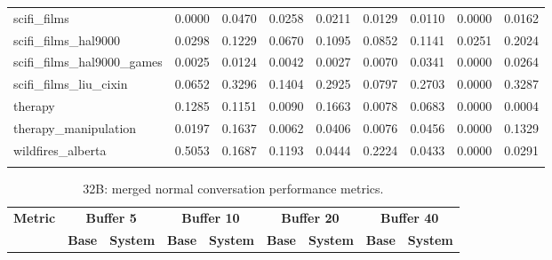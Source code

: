 \begin{landscape}
\begin{longtable}{@{}p{3.8cm}cccccccc@{}}
scifi\_films & 0.0000 & 0.0470 & 0.0258 & 0.0211 & 0.0129 & 0.0110 & 0.0000 & 0.0162 \\
scifi\_films\_hal9000 & 0.0298 & 0.1229 & 0.0670 & 0.1095 & 0.0852 & 0.1141 & 0.0251 & 0.2024 \\
scifi\_films\_hal9000\_games & 0.0025 & 0.0124 & 0.0042 & 0.0027 & 0.0070 & 0.0341 & 0.0000 & 0.0264 \\
scifi\_films\_liu\_cixin & 0.0652 & 0.3296 & 0.1404 & 0.2925 & 0.0797 & 0.2703 & 0.0000 & 0.3287 \\
therapy & 0.1285 & 0.1151 & 0.0090 & 0.1663 & 0.0078 & 0.0683 & 0.0000 & 0.0004 \\
therapy\_manipulation & 0.0197 & 0.1637 & 0.0062 & 0.0406 & 0.0076 & 0.0456 & 0.0000 & 0.1329 \\
wildfires\_alberta & 0.5053 & 0.1687 & 0.1193 & 0.0444 & 0.2224 & 0.0433 & 0.0000 & 0.0291 \\
\botrule
\end{longtable}
\begin{longtable}{@{}p{3.8cm}cccccccc@{}}
\caption{32B: merged normal conversation performance metrics.}\label{tab:app_32b_perf_normal}\\

\toprule
\textbf{Metric} & \multicolumn{2}{c}{\textbf{Buffer 5}} & \multicolumn{2}{c}{\textbf{Buffer 10}} & \multicolumn{2}{c}{\textbf{Buffer 20}} & \multicolumn{2}{c}{\textbf{Buffer 40}} \\
\cmidrule(lr){2-3}\cmidrule(lr){4-5}\cmidrule(lr){6-7}\cmidrule(lr){8-9}
 & \textbf{Base} & \textbf{System} & \textbf{Base} & \textbf{System} & \textbf{Base} & \textbf{System} & \textbf{Base} & \textbf{System} \\
\midrule
\endfirsthead


\end{longtable}
\end{landscape}
